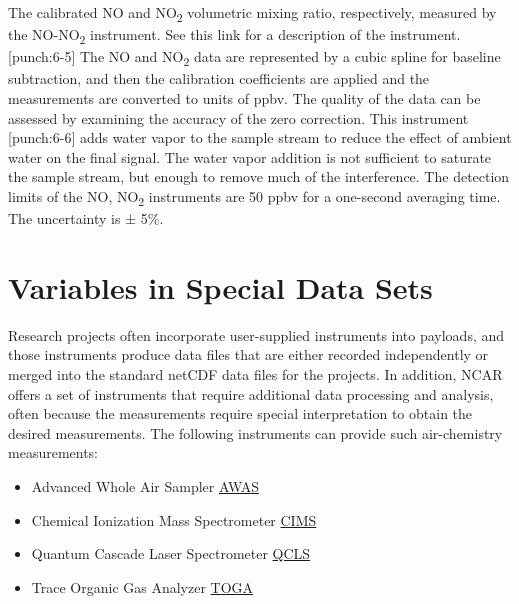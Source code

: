\documentclass[
  english,
]{book}
\begin{document}
The calibrated NO and NO\textsubscript{2} volumetric mixing ratio, respectively, measured by the NO-NO\textsubscript{2} instrument. See this link for a description of the instrument.\protect\hypertarget{punch:6-5}{}{{[}punch:6-5{]}} The NO and NO\textsubscript{2} data are represented by a cubic spline for baseline subtraction, and then the calibration coefficients are applied and the measurements are converted to units of ppbv. The quality of the data can be assessed by examining the accuracy of the zero correction. This instrument \protect\hypertarget{punch:6-6}{}{{[}punch:6-6{]}} adds water vapor to the sample stream to reduce the effect of ambient water on the final signal. The water vapor addition is not sufficient to saturate the sample stream, but enough to remove much of the interference. The detection limits of the NO, NO\textsubscript{2} instruments are 50 ppbv for a one-second averaging time. The uncertainty is {±} 5\%.

\hypertarget{awas-cims-qcls-toga}{%
\section{Variables in Special Data Sets}\label{awas-cims-qcls-toga}}

Research projects often incorporate user-supplied instruments into payloads, and those instruments produce data files that are either recorded independently or merged into the standard netCDF data files for the projects. In addition, NCAR offers a set of instruments that require additional data processing and analysis, often because the measurements require special interpretation to obtain the desired measurements. The following instruments can provide such air-chemistry measurements:

\begin{itemize}
\item
  \setlength{\itemsep}{-1\parsep}Advanced Whole Air Sampler \href{http://www.eol.ucar.edu/instruments/advanced-whole-air-sampler}{AWAS}
\item
  Chemical Ionization Mass Spectrometer \href{http://www.eol.ucar.edu/instruments/georgia-tech-chemical-ionization-mass-spectrometer}{CIMS}
\item
  Quantum Cascade Laser Spectrometer \href{http://www.eol.ucar.edu/instruments/quantum-cascade-laser-spectrometer}{QCLS}
\item
  Trace Organic Gas Analyzer \href{http://www.eol.ucar.edu/instruments/trace-organic-gas-analyzer}{TOGA}
\end{itemize}
\end{document}
